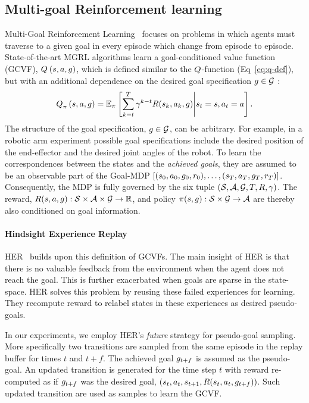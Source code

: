 \subsection{Multi-goal Reinforcement learning}
Multi-Goal Reinforcement Learning~\citep{plappert2018multi} focuses on problems
in which agents must traverse to a given goal in every episode which change from
episode to episode.
State-of-the-art MGRL algorithms learn a goal-conditioned value
function (GCVF), $Q_{}^{}\left({s}, {a}, {g}\right)$, which is defined
similar to the $Q$-function (Eq~\ref{eq:q-def}), but with an additional
dependence on the desired goal specification $g \in \mathcal{G}$ :
%
\begin{align}
Q_{\pi}^{}\left({s}, {a}, {g}\right) = \mathbb{E}_\pi\left[ \sum_{k=t}^T
  \gamma^{k-t} R(s_k, a_k, g)
  \middle| s_t = s, a_t = a \right] .
  \label{eq:q-def}
\end{align}%
%
The structure of the goal specification, $g \in \mathcal{G}$, can be
arbitrary. For example, in a robotic
arm experiment possible goal specifications include the desired position of the
end-effector and the desired joint angles of the robot.
To learn the correspondences between the states and the \emph{achieved goals}, they are
assumed to be an observable part of the Goal-MDP $[(s_0, a_0,
g_0, r_0), \dots, (s_T, a_T, g_T, r_T)]$.
Consequently, the MDP is fully governed by the six tuple $(\mathcal{S},
\mathcal{A},\mathcal{G}, T, R, \gamma)$. The reward, $R(s,a,
g) : \mathcal{S} \times \mathcal{A}\times \mathcal{G} \rightarrow \mathbb{R} $, and policy
$\pi(s, g): \mathcal{S} \times \mathcal{G} \rightarrow \mathcal{A} $ are
thereby also conditioned on goal information.


\paragraph{Hindsight Experience Replay}
HER~\citep{andrychowicz2017hindsight}
builds upon this definition of GCVFs.  The main insight of HER is that there is
no valuable feedback from the environment when the agent does not reach
the goal. This is further exacerbated when goals are
sparse in the state-space. 
HER solves this problem by reusing these failed experiences for learning.
They recompute reward to relabel states in these experiences as desired pseudo-goals.

In our experiments, we employ HER's \emph{future} strategy for
pseudo-goal sampling. More specifically two transitions are
sampled from the same episode in the replay buffer for times $t$ and $t+f$.
The achieved goal $g_{t+f}$ is assumed as the pseudo-goal.
An updated transition is generated for the time step $t$
with reward re-computed as if $g_{t+f}$ was the desired goal,
$(s_{t}, a_t, s_{t+1}, R(s_t, a_t, g_{t+f}))$.
Such updated transition are used as samples to learn the GCVF.



